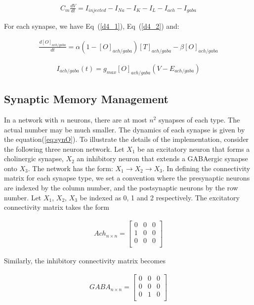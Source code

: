 \documentclass[10pt,letterpaper]{article}
\begin{document}
\begin{eqnarray}C_m\frac{dV}{dt} = I_{injected} - I_{Na} - I_K - I_L - I_{ach} - I_{gaba}\end{eqnarray}

For each synapse, we have Eq~(\ref{d4_1}), Eq~(\ref{d4_2}) and:

\begin{eqnarray}
\frac{d[O]_{ach/gaba}}{dt} = \alpha (1-[O]_{ach/gaba})[T]_{ach/gaba}-\beta[O]_{ach/gaba}
\label{eq:synO}
\end{eqnarray}

\begin{eqnarray}
I_{ach/gaba}(t)=g_{max}[O]_{ach/gaba}(V−E_{ach/gaba})
\label{eq:Isyn}
\end{eqnarray}

\subsection*{Synaptic Memory Management}

In a network with $n$ neurons, there are at most $n^2$ synapses of each type. The actual number may be much smaller. The dynamics of each synapse is given by the equation(\ref{eq:synO}). To illustrate the details of the implementation, consider the following three neuron network. Let $X_1$ be an excitatory neuron that forms a cholinergic synapse, $X_2$ an inhibitory neuron that extends a GABAergic synapse onto $X_3$. The network has the form: $X_1\rightarrow X_2\rightarrow X_3$. In defining the connectivity matrix for each synapse type, we set a convention where the presynaptic neurons are indexed by the column number, and the postsynaptic neurons by the row number. Let $X_1$, $X_2$, $X_3$ be indexed as 0, 1 and 2 respectively. The excitatory connectivity matrix takes the form

\begin{eqnarray}
Ach_{n\times n}=
\begin{bmatrix}
0&0&0\\
1&0&0\\
0&0&0\\
\end{bmatrix}
\end{eqnarray}

Similarly, the inhibitory connectivity matrix becomes

\begin{eqnarray}
GABA_{n\times n}=
\begin{bmatrix}
0&0&0\\
0&0&0\\
0&1&0\\
\end{bmatrix}
\end{eqnarray}
\end{document}
